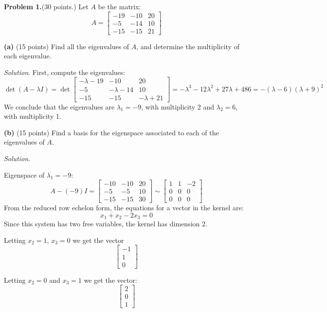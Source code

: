 \documentclass[12pt]{article}
\begin{document}
\textbf{Problem 1.}(30 points.) Let $A$ be the matrix:
\[
A=\left[\begin{matrix}-19 & -10 & 20\\-5 & -14 & 10\\-15 & -15 & 21\end{matrix}\right]
\]

\textbf{(a)} (15 points) Find all the eigenvalues of $A$, and determine the multiplicity of each eigenvalue.

\emph{Solution}. First, compute the eigenvalues:
\[
\det(A-\lambda I)=\det \left[\begin{matrix}- \lambda - 19 & -10 & 20\\-5 & - \lambda - 14 & 10\\-15 & -15 & - \lambda + 21\end{matrix}\right]=- \lambda^{3} - 12 \lambda^{2} + 27 \lambda + 486=- \left(\lambda - 6\right) \left(\lambda + 9\right)^{2}
\]
We conclude that the eigenvalues are $\lambda_1=-9$, with multiplicity 2 and $\lambda_2=6$, with multiplicity 1.\proofend

\textbf{(b)} (15 points) Find a basis for the eigenspace associated to each of the eigenvalues of $A$.

\emph{Solution}.

Eigenspace of $\lambda_1=-9$:
\[
A-(-9)I = \left[\begin{matrix}-10 & -10 & 20\\-5 & -5 & 10\\-15 & -15 & 30\end{matrix}\right]\sim\left[\begin{matrix}1 & 1 & -2\\0 & 0 & 0\\0 & 0 & 0\end{matrix}\right]
\]
From the reduced row echelon form, the equations for a vector in the kernel are:
\[
x_1+x_2-2x_3=0
\]
Since this system has two free variables, the kernel has dimension $2$.

Letting $x_2=1$, $x_3=0$ we get the vector
\[
\begin{bmatrix}-1\\1\\0\end{bmatrix}
\]

Letting $x_2=0$ and $x_3=1$ we get the vector:
\[
\begin{bmatrix}2\\0\\1\end{bmatrix}
\]
\end{document}
